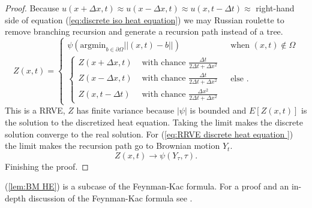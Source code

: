 \documentclass[a4paper,12pt]{article}
\begin{document}
\begin{proof}
    Because $u(x+\Delta x,t) \approx u(x-\Delta x,t) \approx u(x,t-\Delta t) \approx$
    right-hand side of equation (\ref{eq:discrete iso heat equation}) we may Russian roulette
    to remove branching recursion and generate a recursion path instead of a tree.
    \begin{equation} \label{eq:RRVE discrete heat equation }
        Z(x,t) =
        \begin{cases}
            \psi(\text{argmin}_{b \in \partial \Omega} ||(x,t) - b||)
             & \text{ when } (x,t) \notin \Omega \\
            \begin{cases}
                Z(x+\Delta x , t)  & \text{ with chance  } \frac{\Delta t}{ 2 \Delta t + \Delta x^{2}}     \\
                Z(x-\Delta x , t)  & \text{ with chance  } \frac{\Delta t}{ 2 \Delta t + \Delta x^{2}}     \\
                Z(x, t - \Delta t) & \text{ with chance  } \frac{\Delta x^{2}}{ 2 \Delta t + \Delta x^{2}}
            \end{cases}
             & \text{ else }.
        \end{cases}
    \end{equation}
    This is a RRVE, $Z$ has finite variance because $ |\psi|$ is bounded
    and $E[Z(x,t)]$ is the solution to the discretized heat equation. Taking the limit
    makes the discrete solution converge to the real solution.
    For (\ref{eq:RRVE discrete heat equation }) the limit
    makes the recursion path go to Brownian motion $Y_{t}$.
    \begin{equation}
        Z(x,t) \rightarrow \psi(Y_{\tau},\tau)  .
    \end{equation}
    Finishing the proof.
\end{proof}


\begin{related}
    (\ref{lem:BM HE}) is a subcase of the Feynman-Kac formula.
    For a proof and an in-depth discussion of the Feynman-Kac formula
    see \cite{oksendal_stochastic_2003}. \\
\end{related}
\end{document}
